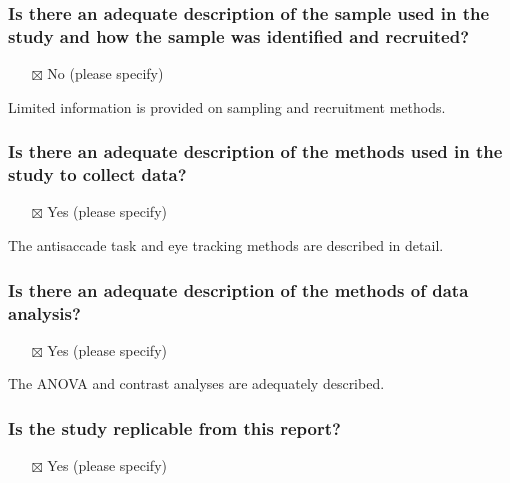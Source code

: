 \documentclass[
  doc, a4paper]{apa7}
\providecommand{\tightlist}{%
  \setlength{\itemsep}{0pt}\setlength{\parskip}{0pt}}
\begin{document}
\subsubsection{Is there an adequate description of the sample used in the study and how the sample was identified and recruited?}\label{is-there-an-adequate-description-of-the-sample-used-in-the-study-and-how-the-sample-was-identified-and-recruited}

\begin{itemize}
\tightlist
\item[$\boxtimes$]
  No (please specify)
\end{itemize}

Limited information is provided on sampling and recruitment methods.

\subsubsection{Is there an adequate description of the methods used in the study to collect data?}\label{is-there-an-adequate-description-of-the-methods-used-in-the-study-to-collect-data}

\begin{itemize}
\tightlist
\item[$\boxtimes$]
  Yes (please specify)
\end{itemize}

The antisaccade task and eye tracking methods are described in detail.

\subsubsection{Is there an adequate description of the methods of data analysis?}\label{is-there-an-adequate-description-of-the-methods-of-data-analysis}

\begin{itemize}
\tightlist
\item[$\boxtimes$]
  Yes (please specify)
\end{itemize}

The ANOVA and contrast analyses are adequately described.

\subsubsection{Is the study replicable from this report?}\label{is-the-study-replicable-from-this-report}

\begin{itemize}
\tightlist
\item[$\boxtimes$]
  Yes (please specify)
\end{itemize}
\end{document}
